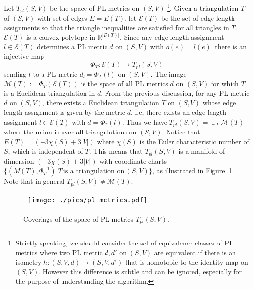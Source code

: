 \documentclass[11pt]{article}
\begin{document}
Let $T_{pl}(S, V)$ be the space of PL metrics on $(S, V)$ 
\footnote{Strictly speaking, we should consider the set of equivalence classes of PL metrics where two PL metric
$d, d'$ on $(S, V)$ are equivalent if there is an isometry $h: (S, V, d) \rightarrow (S, V, d')$ that is homotopic
to the identity map on $(S, V)$. However this difference is subtle and can be ignored, especially for the purpose
of understanding the algorithm. }. Given a triangulation $T$ of $(S, V)$ with set of edges $E=E(T)$, let $\mathcal{E}(T)$
be the set of edge length assignments so that the triangle inequalities are satisfied for all triangles in $T$. 
$\mathcal{E}(T)$ is a convex polytope in $\mathbb{R}^{|E(T)|}$. Since any edge length assignment $l\in \mathcal{E}(T)$ 
determines a PL metric $d$ on $(S, V)$ with $d(e) = l(e)$, there is an injective map 
\begin{equation}
\Phi_T: \mathcal{E}(T) \rightarrow T_{pl}(S, V)
\end{equation}
sending $l$ to a PL metric $d_l=\Phi_T(l) $ on $(S, V)$. The image $\mathcal{M}(T) := \Phi_T(\mathcal{E}(T))$ is the space
of all PL metrics $d$ on $(S, V)$ for which $T$ is a Euclidean triangulation in $d$. 
From the previous discussion, for any PL metric $d$ on 
$(S, V)$, there exists a Euclidean triangulation $T$ on $(S, V)$ whose edge length assignment is
given by the metric $d$, i.e, there exists an edge length assignment $l\in \mathcal{E}(T)$ with $d = \Phi_T(l)$.  
Thus we have $T_{pl}(S, V) = \cup_T \mathcal{M}(T) $ where the union is over all triangulations on $(S, V)$. Notice that
$E(T) = (-3\chi(S) + 3|V|)$ where $\chi(S)$ is the Euler characteristic number of $S$, which is independent of $T$. 
This means that  $T_{pl}(S, V)$ is a manifold of dimension $(-3\chi(S) + 3|V|)$
with coordinate charts $\{(M(T), \Phi_T^{-1}) | T~\text{is a triangulation on}~(S, V)\}$, as illustrated in 
Figure~\ref{fig:pl_metrics}. Note that in general $T_{pl}(S, V) \neq \mathcal{M}(T)$.

\begin{figure}[t]
\begin{center}
\begin{tabular}{c}
\texttt{[image: ./pics/pl\_metrics.pdf]}
\end{tabular}
\vspace{-0.1in}
\end{center}
\caption{Coverings of the space of PL metrics $T_{pl}(S, V)$.
\label{fig:pl_metrics}}
\end{figure}
\end{document}
